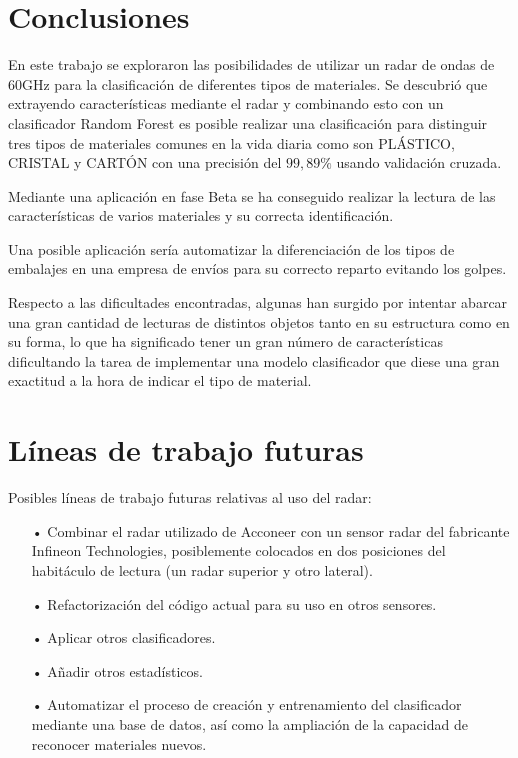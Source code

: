 
\section{Conclusiones}

En este trabajo se exploraron las posibilidades de utilizar un radar de ondas de 60GHz para la clasificación de diferentes tipos de materiales. Se descubrió que extrayendo características mediante el radar y combinando esto con un clasificador Random Forest es posible realizar una clasificación  para distinguir tres tipos de materiales comunes en la vida diaria como son PLÁSTICO, CRISTAL y CARTÓN con una precisión del $ 99,89\% $ usando validación cruzada. 

Mediante una aplicación en fase Beta se ha conseguido realizar la lectura de las características de varios materiales y su correcta identificación.

Una posible aplicación sería automatizar la diferenciación de los tipos de embalajes en una empresa de envíos para su correcto reparto evitando los golpes.

Respecto a las dificultades encontradas, algunas han surgido por intentar abarcar una gran cantidad de lecturas de distintos objetos tanto en su estructura como en su forma, lo que ha significado tener un gran número de características dificultando la tarea de implementar una modelo clasificador que diese una gran exactitud a la hora de indicar el tipo de material.

\section{Líneas de trabajo futuras}

Posibles líneas de trabajo futuras relativas al uso del radar:

\begin{itemize}
\item[•] Combinar el radar utilizado de Acconeer con un sensor radar del fabricante Infineon Technologies, posiblemente colocados en dos posiciones del habitáculo de lectura (un radar superior y otro lateral).
\item[•] Refactorización del código actual para su uso en otros sensores.
\item[•] Aplicar otros clasificadores.
\item[•] Añadir otros estadísticos.
\item[•] Automatizar el proceso de creación y entrenamiento del clasificador mediante una base de datos, así como la ampliación de la capacidad de reconocer materiales nuevos.
\end{itemize}

